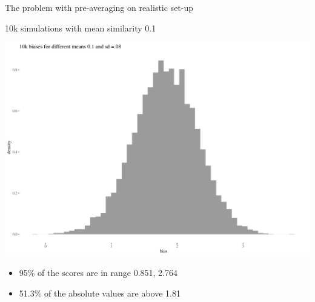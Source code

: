 \documentclass[
  10pt,
  ignorenonframetext,
  x11names, dvipsnames, bibspacing,natbib, table]{beamer}
\providecommand{\tightlist}{%
  \setlength{\itemsep}{0pt}\setlength{\parskip}{0pt}}
\begin{document}
\begin{frame}{The problem with pre-averaging on realistic set-up}
\protect\hypertarget{the-problem-with-pre-averaging-on-realistic-set-up-2}{}
\begin{block}{10k simulations with mean similarity 0.1}
\protect\hypertarget{k-simulations-with-mean-similarity-0.1}{}
\vspace{1mm}
\footnotesize

\begin{center}\includegraphics[width=0.8\linewidth]{presentationBoston_files/figure-beamer/unnamed-chunk-11-1} \end{center}
\vspace{1mm}
\footnotesize

\normalsize

\footnotesize

\vspace{-2mm}

\begin{itemize}
\tightlist
\item
  95\% of the scores are in range 0.851, 2.764
\item
  51.3\% of the absolute values are above 1.81
\end{itemize}
\end{block}
\end{frame}
\end{document}
